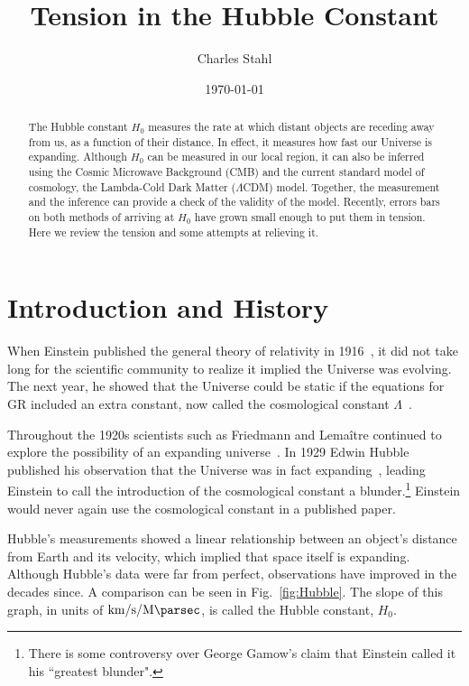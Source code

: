 \documentclass[12pt]{article}
\title{Tension in the Hubble Constant}
\author{Charles Stahl}
\date{\today}
\newcommand{\units}{\kilo\meter\per\second\per\mega\parsec}
\newcommand{\hnaught}[1]{\SI{#1}{\units}}
\renewcommand{\L}{$\Lambda$}
\begin{document}
\begin{singlespace}
\maketitle

\begin{abstract}
\normalsize
The Hubble constant $H_0$ measures the rate at which distant objects are receding away from us, as a function of their distance. In effect, it measures how fast our Universe is expanding. Although $H_0$ can be measured in our local region, it can also be inferred using the Cosmic Microwave Background (CMB) and the current standard model of cosmology, the Lambda-Cold Dark Matter (\L CDM) model. Together, the measurement and the inference can provide a check of the validity of the model. Recently, errors bars on both methods of arriving at $H_0$ have grown small enough to put them in tension. Here we review the tension and some attempts at relieving it.
\end{abstract}

\tableofcontents
\end{singlespace}

\section{Introduction and History} \label{sec:int}

When Einstein published the general theory of relativity in 1916~\cite{Einstein1916}, it did not take long for the scientific community to realize it implied the Universe was evolving. The next year, he showed that the Universe could be static if the equations for GR included an extra constant, now called the cosmological constant $\Lambda$~\cite{Einstein1917}.

Throughout the 1920s scientists such as Friedmann and Lema\^{i}tre continued to explore the possibility of an expanding universe~\cite{Friedman1922, Lemaitre1927}. In 1929 Edwin Hubble published his observation that the Universe was in fact expanding~\cite{Hubble1929}, leading Einstein to call the introduction of the cosmological constant a blunder.\footnote{There is some controversy over George Gamow's claim that Einstein called it his ``greatest blunder".} Einstein would never again use the cosmological constant in a published paper.

Hubble's measurements showed a linear relationship between an object's distance from Earth and its velocity, which implied that space itself is expanding. Although Hubble's data were far from perfect, observations have improved in the decades since. A comparison can be seen in Fig.~\ref{fig:Hubble}. The slope of this graph, in units of $\hnaught{}$, is called the Hubble constant, $H_0$.
\end{document}
